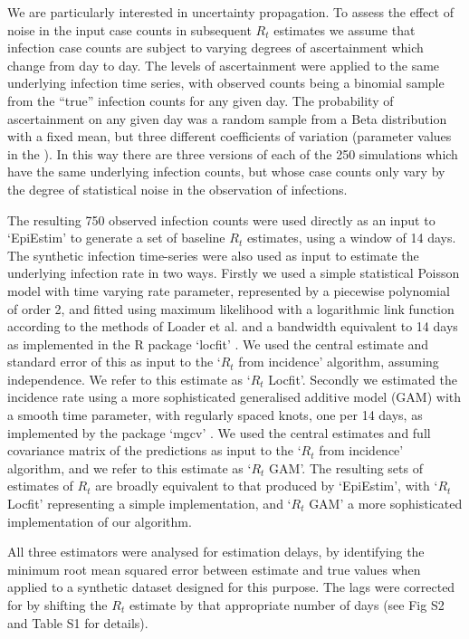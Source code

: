 \documentclass[10pt,letterpaper]{article}
\begin{document}
We are particularly interested in uncertainty propagation. To assess the effect of noise in the input case counts in subsequent $R_t$ estimates we assume that infection case counts are subject to varying degrees of ascertainment which change from day to day. The levels of ascertainment were applied to the same underlying infection time series, with observed counts being a binomial sample from the ``true'' infection counts for any given day. The probability of ascertainment on any given day was a random sample from a Beta distribution with a fixed mean, but three different coefficients of variation (parameter values in the ). In this way there are three versions of each of the 250 simulations which have the same underlying infection counts, but whose case counts only vary by the degree of statistical noise in the observation of infections.

The resulting 750 observed infection counts were used directly as an input to `EpiEstim' to generate a set of baseline $R_t$ estimates, using a window of 14 days. The synthetic infection time-series were also used as input to estimate the underlying infection rate in two ways. Firstly we used a simple statistical Poisson model with time varying rate parameter, represented by a piecewise polynomial of order 2, and fitted using maximum likelihood with a logarithmic link function according to the methods of Loader et al. \cite{loader1999} and a bandwidth equivalent to 14 days as implemented in the R package `locfit' \cite{loader2020}. We used the central estimate and standard error of this as input to the `$R_t$ from incidence' algorithm, assuming independence. We refer to this estimate as `$R_t$ Locfit'. Secondly we estimated the incidence rate using a more sophisticated generalised additive model (GAM) with a smooth time parameter, with regularly spaced knots, one per 14 days, as implemented by the package `mgcv' \cite{wood2017}. We used the central estimates and full covariance matrix of the predictions as input to the `$R_t$ from incidence' algorithm, and we refer to this estimate as `$R_t$ GAM'. The resulting sets of estimates of $R_t$ are broadly equivalent to that produced by `EpiEstim', with `$R_t$ Locfit' representing a simple implementation, and `$R_t$ GAM' a more sophisticated implementation of our algorithm.

All three estimators were analysed for estimation delays, by identifying the minimum root mean squared error between estimate and true values when applied to a synthetic dataset designed for this purpose. The lags were corrected for by shifting the $R_t$ estimate by that appropriate number of days (see  Fig S2 and Table S1 for details).
\end{document}
